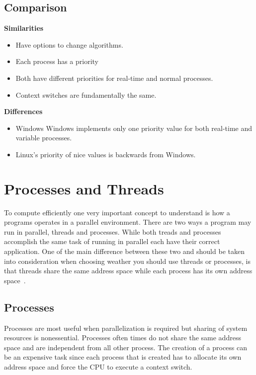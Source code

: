 \documentclass[letterpaper,10pt,notitlepage,fleqn]{article}
\begin{document}
\subsection*{Comparison}
\noindent \textbf{Similarities}\\
\begin{itemize}
    \item Have options to change algorithms.
    \item Each process has a priority
    \item Both have different priorities for real-time and normal processes.
    \item Context switches are fundamentally the same.
\end{itemize}
\noindent \textbf{Differences}\\
\begin{itemize}
    \item Windows Windows implements only one priority value for both real-time and 
    variable processes.
    \item Linux's priority of nice values is backwards from Windows.

\end{itemize}


\section{Processes and Threads}
To compute efficiently one very important concept to understand is how a programs operates in 
a parallel environment. There are two ways a program may run in parallel, 
threads and processes. While both treads and processes accomplish the same task of 
running in parallel each have their correct application. One of the main difference 
between these two and should be taken into consideration when choosing weather 
you should use threads or processes, is that threads 
share the same address space while each process has its own address space~\cite{PI}.

\subsection{Processes}
Processes are most useful when parallelization is required but sharing of system resources 
is nonessential. Processes often times do not share the same address space and are independent 
from all other process. The creation of a process can be an expensive task since 
each process that is created has to allocate its own address space and force the 
CPU to execute a context switch. 
\end{document}
